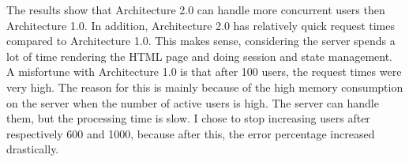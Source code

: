 %
%
The results show that Architecture 2.0 can handle more concurrent users then Architecture 1.0. In addition, Architecture 2.0 has relatively quick request times compared to Architecture 1.0. This makes sense, considering the server spends a lot of time rendering the HTML page and doing session and state management. A misfortune with Architecture 1.0 is that after 100 users, the request times were very high. The reason for this is mainly because of the high memory consumption on the server when the number of active users is high. The server can handle them, but the processing time is slow. I chose to stop increasing users after respectively 600 and 1000, because after this, the error percentage increased drastically.

